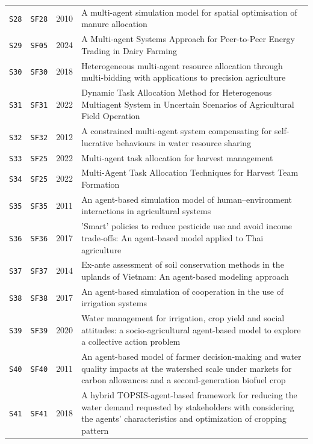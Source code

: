 \begin{longtable}{@{}p{}p{}p{}p{}@{}}
\texttt{S28} & \texttt{SF28} & 2010 & A multi-agent simulation model for spatial optimisation of manure allocation\\
\texttt{S29} & \texttt{SF05} & 2024 & A Multi-agent Systems Approach for Peer-to-Peer Energy Trading in Dairy Farming\\
\texttt{S30} & \texttt{SF30} & 2018 & Heterogeneous multi-agent resource allocation through multi-bidding with applications to precision agriculture\\
\texttt{S31} & \texttt{SF31} & 2022 & Dynamic Task Allocation Method for Heterogenous Multiagent System in Uncertain Scenarios of Agricultural Field Operation\\
\texttt{S32} & \texttt{SF32} & 2012 & A constrained multi-agent system compensating for self-lucrative behaviours in water resource sharing\\
\texttt{S33} & \texttt{SF25} & 2022 & Multi-agent task allocation for harvest management\\
\texttt{S34} & \texttt{SF25} & 2022 & Multi-Agent Task Allocation Techniques for Harvest Team Formation\\
\texttt{S35} & \texttt{SF35} & 2011 & An agent-based simulation model of human--environment interactions in agricultural systems\\
\texttt{S36} & \texttt{SF36} & 2017 & 'Smart' policies to reduce pesticide use and avoid income trade-offs: An agent-based model applied to Thai agriculture\\
\texttt{S37} & \texttt{SF37} & 2014 & Ex-ante assessment of soil conservation methods in the uplands of Vietnam: An agent-based modeling approach\\
\texttt{S38} & \texttt{SF38} & 2017 & An agent-based simulation of cooperation in the use of irrigation systems\\
\texttt{S39} & \texttt{SF39} & 2020 & Water management for irrigation, crop yield and social attitudes: a socio-agricultural agent-based model to explore a collective action problem\\
\texttt{S40} & \texttt{SF40} & 2011 & An agent-based model of farmer decision-making and water quality impacts at the watershed scale under markets for carbon allowances and a second-generation biofuel crop\\
\texttt{S41} & \texttt{SF41} & 2018 & A hybrid TOPSIS-agent-based framework for reducing the water demand requested by stakeholders with considering the agents' characteristics and optimization of cropping pattern\\

\end{longtable}
